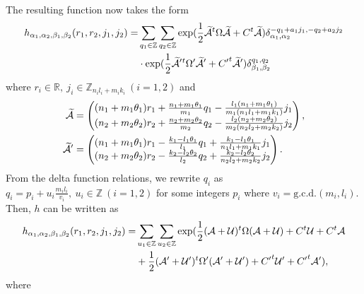 \documentclass[12pt, a4paper]{article}
\newcommand{\Z}{{\mathbb Z}}
\newcommand{\R}{{\mathbb R}}
\begin{document}
The resulting function now takes the form
\begin{align*} \label{tensorh1}
h_{\alpha_1, \alpha_2, \beta_1, \beta_2}(r_1,r_2,j_1,j_2) =  &
\sum_{q_1 \in \Z} \sum_{q_2 \in \Z} \exp ( \frac{1}{2}
\widetilde{\cal A}^t \Omega \widetilde{\cal A} + C^t
\widetilde{\cal A} ) \delta_{\alpha_1,\alpha_2}^{-q_1 +a_1j_1,-q_2 +a_2j_2} \\
& \cdot \exp ( \frac{1}{2} {\widetilde{\cal A}}'{}^t \Omega'
\widetilde{\cal A}' + {C'}^t \widetilde{\cal A}' )
\delta_{\beta_1,\beta_2}^{q_1 , q_2 }
\end{align*}
where $r_i \in \R , \ j_i \in \Z_{n_il_i +m_ik_i} \ (i=1,2) $ and
\begin{align*}
\widetilde{\cal A} & = \begin{pmatrix} (n_1 +m_1 \theta_1)r_1 +
\frac{n_1 +m_1 \theta_1}{m_1}q_1 - \frac{l_1(n_1 +m_1
\theta_1)}{m_1(n_1l_1
+m_1k_1)}j_1 \\
 (n_2 +m_2 \theta_2)r_2 + \frac{n_2 +m_2 \theta_2}{m_2}q_2 -
\frac{l_2(n_2 +m_2 \theta_2)}{m_2(n_2l_2 +m_2k_2)}j_2
\end{pmatrix} , \\
\widetilde{\cal A}' & = \begin{pmatrix} (n_1 +m_1 \theta_1)r_1 -
\frac{k_1 - l_1 \theta_1}{l_1}q_1 + \frac{k_1 -l_1
\theta_1}{n_1l_1
+m_1k_1}j_1 \\
 (n_2 +m_2 \theta_2)r_2 - \frac{k_2 -l_2 \theta_2}{l_2}q_2 +
\frac{k_2 -l_2 \theta_2}{n_2l_2 +m_2k_2}j_2
\end{pmatrix}  .
\end{align*}
  From the delta function relations, we rewrite $q_i$ as \( q_i = p_i + u_i
\frac{m_i l_i}{v_i} , \ u_i \in \Z \ (i=1,2) \) for some integers
 $p_i$ where $ v_i = \text{g.c.d.}(m_i,l_i) $.
 Then, $h$ can be written as
\begin{align*}
h_{\alpha_1, \alpha_2, \beta_1, \beta_2}(r_1,r_2,j_1,j_2) = &
\sum_{u_1 \in \Z} \sum_{u_2 \in \Z} \exp ( \frac{1}{2}( {\cal A} +
{\cal U} )^t \Omega ({\cal A} + {\cal U})
 + C^t {\cal U} + C^t {\cal A} \\
 &   + \frac{1}{2}( {\cal A}' + {\cal U}' )^t \Omega' ({\cal A}' +
  {\cal U}' ) + {C'}^t {\cal U}' + {C'}^t {\cal A}' ) ,
\end{align*}
where
\end{document}
